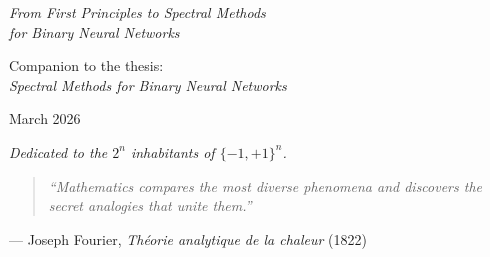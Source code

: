 \documentclass[12pt,a4paper]{report}
\theoremstyle{plain}
\theoremstyle{definition}
\theoremstyle{remark}
\begin{document}
\begin{titlepage}

\vspace{0.8cm}

{\large\itshape From First Principles to Spectral Methods\\[3pt]
for Binary Neural Networks}

\vfill

{\large Companion to the thesis:\\[4pt]
\textit{Spectral Methods for Binary Neural Networks}}

\vspace{0.8cm}

{\large March 2026}

\vspace{0.5cm}

\end{titlepage}


\newpage
\thispagestyle{empty}
\vspace*{\fill}
\begin{center}
\large\itshape
Dedicated to the $2^n$ inhabitants of $\{-1,+1\}^n$.
\end{center}
\vspace*{\fill}


\newpage
\thispagestyle{empty}
\vspace*{3cm}

\begin{quote}
\large\itshape
``Mathematics compares the most diverse phenomena and discovers the
secret analogies that unite them.''
\end{quote}
\hfill --- Joseph Fourier, \textit{Th\'eorie analytique de la chaleur} (1822)

\vspace{2cm}
\end{document}
